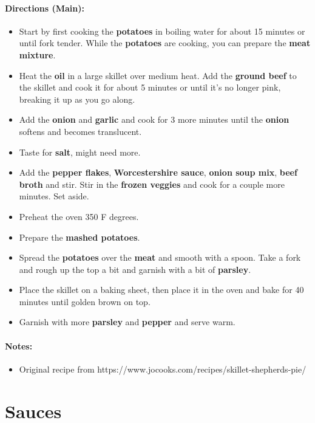 \documentclass{article}
\begin{document}
\paragraph{Directions (Main):}
\begin{itemize}
    \item Start by first cooking the \textbf{potatoes} in boiling water for about 15 minutes or until fork tender. While the \textbf{potatoes} are cooking, you can prepare the \textbf{meat mixture}.
    \item Heat the \textbf{oil} in a large skillet over medium heat. Add the \textbf{ground beef} to the skillet and cook it for about 5 minutes or until it’s no longer pink, breaking it up as you go along.
    \item Add the \textbf{onion} and \textbf{garlic} and cook for 3 more minutes until the \textbf{onion} softens and becomes translucent.
    \item Taste for \textbf{salt}, might need more.
    \item Add the \textbf{pepper flakes}, \textbf{Worcestershire sauce}, \textbf{onion soup mix}, \textbf{beef broth} and stir. Stir in the \textbf{frozen veggies} and cook for a couple more minutes. Set aside.
    \item Preheat the oven 350 F degrees.
    \item Prepare the \textbf{mashed potatoes}.
    \item Spread the \textbf{potatoes} over the \textbf{meat} and smooth with a spoon. Take a fork and rough up the top a bit and garnish with a bit of \textbf{parsley}.
    \item Place the skillet on a baking sheet, then place it in the oven and bake for 40 minutes until golden brown on top.
    \item Garnish with more \textbf{parsley} and \textbf{pepper} and serve warm.
\end{itemize} 

\paragraph{Notes:}
\begin{itemize}
    \item Original recipe from https://www.jocooks.com/recipes/skillet-shepherds-pie/
\end{itemize}

\section{Sauces}
\end{document}
